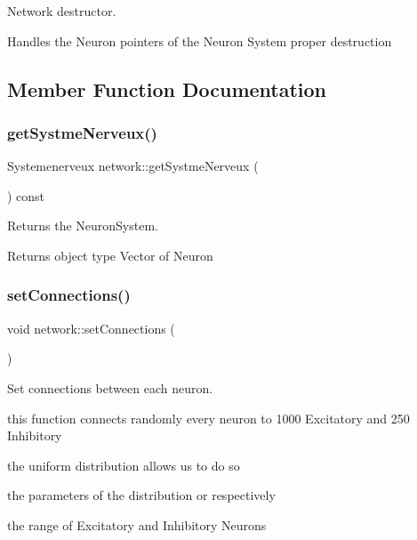 Network destructor. 

Handles the Neuron pointers of the Neuron System proper destruction 

\subsection{Member Function Documentation}
\mbox{\label{classnetwork_af0a14e17b85528ee182e35127de7e2b5}} 
\subsubsection{\texorpdfstring{get\+Systme\+Nerveux()}{getSystmeNerveux()}}
{\footnotesize\ttfamily Systemenerveux network\+::get\+Systme\+Nerveux (\begin{DoxyParamCaption}{ }\end{DoxyParamCaption}) const}



Returns the Neuron\+System. 

\begin{DoxyReturn}{Returns}
object type Vector of Neuron 
\end{DoxyReturn}
\mbox{\label{classnetwork_acf46b197f5e56df426dc3f105add3e97}} 
\subsubsection{\texorpdfstring{set\+Connections()}{setConnections()}}
{\footnotesize\ttfamily void network\+::set\+Connections (\begin{DoxyParamCaption}{ }\end{DoxyParamCaption})}



Set connections between each neuron. 

this function connects randomly every neuron to 1000 Excitatory and 250 Inhibitory

the uniform distribution allows us to do so

the parameters of the distribution or respectively

the range of Excitatory and Inhibitory Neurons

